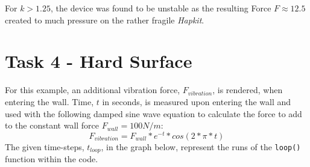   \begin{figure}[H]
    \centering
  \end{figure}

  For $k > 1.25$, the device was found to be unstable as the resulting Force $F \approx 12.5$ created to much pressure on the rather fragile \textit{Hapkit}.

  \section*{Task 4 - Hard Surface}

  For this example, an additional vibration force, $F_{vibration}$, is rendered, when entering the wall. Time, $t$ in seconds, is measured upon entering the wall and used with the following damped sine wave equation to calculate the force to add to the constant wall force $F_{wall} = 100 N/m$:
  \begin{equation*}
    F_{vibration} = F_{wall} * e^{-t} * cos(2 * \pi * t)
  \end{equation*}
  The given time-steps, $t_{loop}$, in the graph below, represent the runs of the \texttt{loop()} function within the code.

